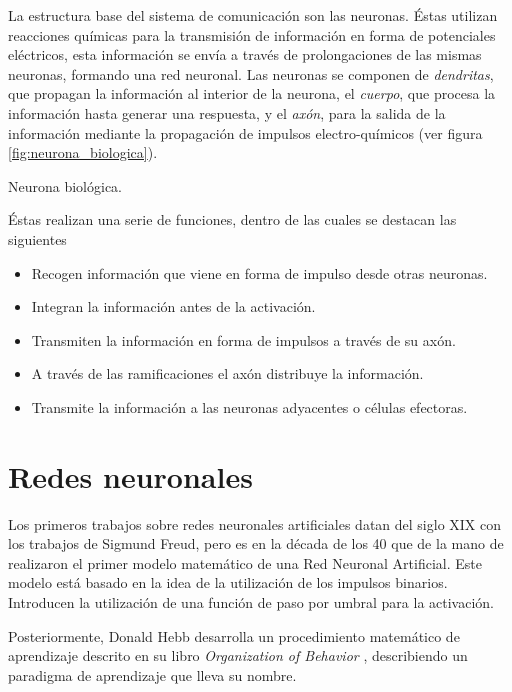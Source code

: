 La estructura base del sistema de comunicación son las neuronas. Éstas utilizan reacciones químicas para la transmisión de información en forma de potenciales eléctricos, esta información se envía a través de prolongaciones de las mismas neuronas, formando una red neuronal. Las neuronas se componen de {\em dendritas}, que propagan la información al interior de la neurona, el {\em cuerpo}, que procesa la información hasta generar una respuesta, y el {\em axón}, para la salida de la información mediante la propagación de impulsos electro-químicos (ver figura \ref{fig:neurona_biologica}).
\begin{imagen}
    \scalebox{0.1}{}
    \caption{Neurona biológica.}
    \label{fig:neurona_biologica}
\end{imagen}

Éstas realizan una serie de funciones, dentro de las cuales se destacan las siguientes
\begin{itemize}
    \item Recogen información que viene en forma de impulso desde otras neuronas.
    \item Integran la información antes de la activación.
    \item Transmiten la información en forma de impulsos a través de su axón.
    \item A través de las ramificaciones el axón distribuye la información.
    \item Transmite la información a las neuronas adyacentes o células efectoras.
\end{itemize}


\section{Redes neuronales}
Los primeros trabajos sobre redes neuronales artificiales datan del siglo XIX con los trabajos de Sigmund Freud, pero es en la década de los 40 que de la mano de  realizaron el primer modelo matemático de una Red Neuronal Artificial. Este modelo está basado en la idea de la utilización de los impulsos binarios. Introducen la utilización de una función de paso por umbral para la activación.

Posteriormente, Donald Hebb desarrolla un procedimiento matemático de aprendizaje descrito en su libro {\em Organization of Behavior} \cite{hebb2002}, describiendo un paradigma de aprendizaje que lleva su nombre.


